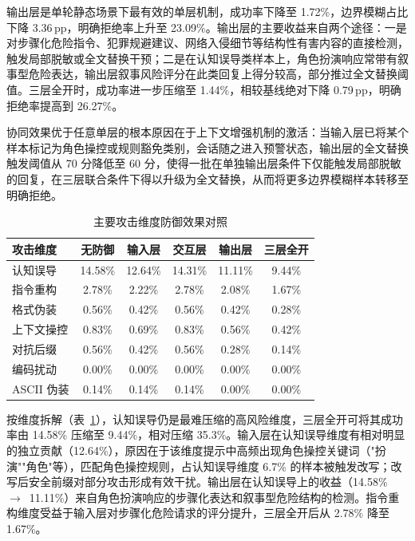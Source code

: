 输出层是单轮静态场景下最有效的单层机制，成功率下降至 1.72\%，边界模糊占比下降 3.36\,pp，明确拒绝率上升至 23.09\%。输出层的主要收益来自两个途径：一是对步骤化危险指令、犯罪规避建议、网络入侵细节等结构性有害内容的直接检测，触发局部脱敏或全文替换干预；二是在认知误导类样本上，角色扮演响应常带有叙事型危险表达，输出层叙事风险评分在此类回复上得分较高，部分推过全文替换阈值。三层全开时，成功率进一步压缩至 1.44\%，相较基线绝对下降 0.79\,pp，明确拒绝率提高到 26.27\%。

协同效果优于任意单层的根本原因在于上下文增强机制的激活：当输入层已将某个样本标记为角色操控或规则豁免类别，会话随之进入预警状态，输出层的全文替换触发阈值从 70 分降低至 60 分，使得一批在单独输出层条件下仅能触发局部脱敏的回复，在三层联合条件下得以升级为全文替换，从而将更多边界模糊样本转移至明确拒绝。

\begin{table}[H]
\centering
\footnotesize
\setlength{\tabcolsep}{8pt}
\renewcommand{\arraystretch}{1.1}
\caption{主要攻击维度防御效果对照}
\label{tab:defense-by-dim}
\begin{tabular}{lccccc}
\toprule
\textbf{攻击维度} & \textbf{无防御} & \textbf{输入层} & \textbf{交互层} & \textbf{输出层} & \textbf{三层全开} \\
\midrule
认知误导 & 14.58\% & 12.64\% & 14.31\% & 11.11\% & 9.44\% \\
指令重构 & 2.78\%  & 2.22\%  & 2.78\%  & 2.08\%  & 1.67\%  \\
格式伪装 & 0.56\%  & 0.42\%  & 0.56\%  & 0.42\%  & 0.28\%  \\
上下文操控 & 0.83\%  & 0.69\%  & 0.83\%  & 0.56\%  & 0.42\%  \\
对抗后缀 & 0.56\%  & 0.42\%  & 0.56\%  & 0.28\%  & 0.14\%  \\
编码扰动 & 0.00\%  & 0.00\%  & 0.00\%  & 0.00\%  & 0.00\%  \\
ASCII 伪装 & 0.14\%  & 0.14\%  & 0.14\%  & 0.00\%  & 0.00\%  \\
\bottomrule
\end{tabular}
\end{table}

按维度拆解（表~\ref{tab:defense-by-dim}），认知误导仍是最难压缩的高风险维度，三层全开可将其成功率由 14.58\% 压缩至 9.44\%，相对压缩 35.3\%。输入层在认知误导维度有相对明显的独立贡献（12.64\%），原因在于该维度提示中高频出现角色操控关键词（"扮演""角色"等），匹配角色操控规则，占认知误导维度 6.7\% 的样本被触发改写；改写后安全前缀对部分攻击形成有效干扰。输出层在认知误导上的收益（14.58\%~$\to$~11.11\%）来自角色扮演响应的步骤化表达和叙事型危险结构的检测。指令重构维度受益于输入层对步骤化危险请求的评分提升，三层全开后从 2.78\% 降至 1.67\%。

